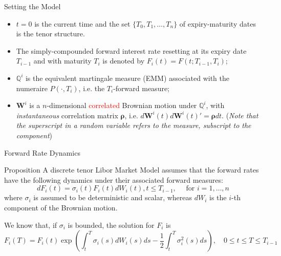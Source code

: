 \documentclass{beamer}
\begin{document}
\begin{frame}{Setting the Model}
  \begin{itemize}
  \item<1-> $t = 0$ is the current time and the set $\{T_0, T_1, \dots, T_n\}$ of expiry-maturity dates is the tenor structure. %
  \item<2-> The simply-compounded forward interest rate resetting at its expiry date $T_{i-1}$ and with maturity $T_i$ is denoted by $F_i(t) = F(t; T_{i-1}, T_i)$;
  \item<3-> $\mathbb{Q}^i$ is the equivalent martingale measure (EMM) associated with the numeraire $P(\cdot, T_i)$, i.e. the $T_i$-forward measure;
  \item<4-> $\bm{W}^i$ is a $n$-dimensional \textcolor{red}{correlated} Brownian motion under $\mathbb{Q}^i$, with \emph{instantaneous} correlation matrix $\bm{\rho}$, i.e. $d\bm{W}^i(t) d\bm{W}^i(t)' = \bm{\rho} dt$. (\emph{Note that the superscript in a random variable refers to the measure, subscript to the component})
  \end{itemize}
\end{frame}

\begin{frame}{Forward Rate Dynamics}
  \begin{block}{Proposition}
    A discrete tenor Libor Market Model assumes that the forward rates have the following dynamics under their associated forward measures:
    \begin{equation}
      dF_i(t) = \sigma_i(t)F_i(t)dW_i(t), t \le T_{i-1},\quad\text{ for } i = 1,\ldots, n
      \label{eq:forward_process_lmm}
    \end{equation}
    where $\sigma_i$ is assumed to be deterministic and scalar, whereas $dW_i$ is the $i$-th component of the Brownian motion.
  \end{block}
\pause
  We know that, if $\sigma_i$ is bounded, the solution for $F_i$ is 
  \begin{equation*}
    F_i(T) = F_i(t) \exp\left(\int_t^T\sigma_i(s)dW_i(s)ds - \frac{1}{2}\int_t^T 
    \sigma_i^2(s)ds\right),\quad 0\le t \le T \le T_{i-1} 
  \end{equation*}
\end{frame}
\end{document}
